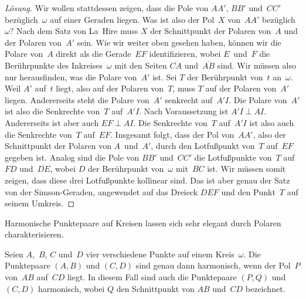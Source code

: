 \begin{proof}[Lösung]
	Wir wollen stattdessen zeigen, dass die Pole von $AA'$, $BB'$ und~$CC'$ bezüglich~$\omega$ auf einer Geraden liegen. Was ist also der Pol~$X$ von~$AA'$ bezüglich~$\omega$? Nach dem Satz von La~Hire muss $X$ der Schnittpunkt der Polaren von~$A$ und der Polaren von~$A'$ sein. Wie wir weiter oben gesehen haben, können wir die Polare von~$A$ direkt als die Gerade~$EF$ identifizieren, wobei $E$~und~$F$ die Berührpunkte des Inkreises~$\omega$ mit den Seiten $\overline{CA}$ und~$\overline{AB}$ sind. Wir müssen also nur herausfinden, was die Polare von~$A'$ ist. Sei $T$ der Berührpunkt von~$t$ an~$\omega$. Weil $A'$ auf~$t$ liegt, also auf der Polaren von~$T$, muss $T$ auf der Polaren von~$A'$ liegen. Andererseits steht die Polare von~$A'$ senkrecht auf~$A'I$. Die Polare von~$A'$ ist also die Senkrechte von~$T$ auf~$A'I$. Nach Voraussetzung ist $A'I\perp AI$. Andererseits ist aber auch $EF\perp AI$. Die Senkrechte von~$T$ auf~$A'I$ ist also auch die Senkrechte von~$T$ auf~$EF$. Insgesamt folgt, dass der Pol von~$AA'$, also der Schnittpunkt der Polaren von $A$~und~$A'$, durch den Lotfußpunkt von~$T$ auf~$EF$ gegeben ist. Analog sind die Pole von $BB'$ und~$CC'$ die Lotfußpunkte von~$T$ auf $FD$ und~$DE$, wobei $D$ der Berührpunkt von~$\omega$ mit~$\overline{BC}$ ist. Wir müssen somit zeigen, dass diese drei Lotfußpunkte kollinear sind. Das ist aber genau der Satz von der Simson-Geraden, angewendet auf das Dreieck $DEF$ und den Punkt~$T$ auf seinem Umkreis.
\end{proof}

Harmonische Punktepaare auf Kreisen lassen sich sehr elegant durch Polaren charakterisieren.

\begin{satzmitnamen}[Lemma]
	Seien $A$,~$B$, $C$ und~$D$ vier verschiedene Punkte auf einem Kreis~$\omega$. Die Punktepaare $(A,B)$ und $(C,D)$ sind genau dann harmonisch, wenn der Pol~\(P\) von~$AB$ auf~$CD$ liegt. In diesem Fall sind auch die Punktepaare $(P,Q)$ und $(C,D)$ harmonisch, wobei $Q$ den Schnittpunkt von $AB$ und~$CD$ bezeichnet.
\end{satzmitnamen}

